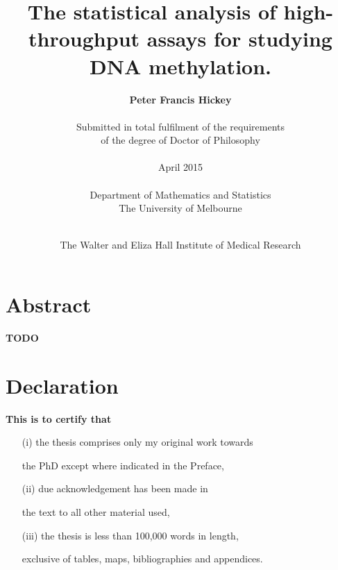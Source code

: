 \documentclass[11pt,a4paper,oneside]{book}	%
\begin{document}


\title{\huge \bf The statistical analysis of high-throughput assays
for studying DNA methylation.\\}

\author{{\bf \Large Peter Francis Hickey}\\\\
Submitted in total fulfilment of the requirements\\
of the degree of Doctor of Philosophy\\\\
April 2015\\\\
Department of Mathematics and Statistics\\
The University of Melbourne\\\\}

\date{The Walter and Eliza Hall Institute of Medical Research}

\maketitle

\frontmatter

\chapter{Abstract}


\textbf{TODO}


\chapter{Declaration}

{\bf This is to certify that}

\begin{itemize}

\item [(i)] the thesis comprises only my original work towards

the PhD except where indicated in the Preface,

\item [(ii)] due acknowledgement has been made in

the text to all other material used,

\item [(iii)] the thesis is less than 100,000 words in length,

exclusive of tables, maps, bibliographies and appendices.

\end{itemize}
\end{document}
